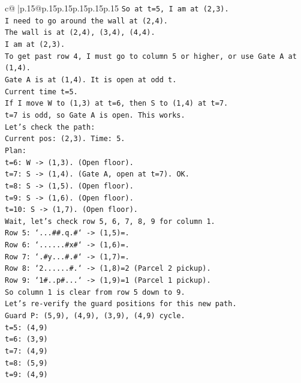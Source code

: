\documentclass{article}
\begin{document}
{\begin{supertabular}{c@{$\;$}|p{.15\linewidth}@{}p{.15\linewidth}p{.15\linewidth}p{.15\linewidth}p{.15\linewidth}p{.15\linewidth}}
{{{\texttt{So at t=5, I am at (2,3).} \\
\texttt{I need to go around the wall at (2,4).} \\
\texttt{The wall is at (2,4), (3,4), (4,4).} \\
\texttt{I am at (2,3).} \\
\texttt{To get past row 4, I must go to column 5 or higher, or use Gate A at (1,4).} \\
\texttt{Gate A is at (1,4). It is open at odd t.} \\
\texttt{Current time t=5.} \\
\texttt{If I move W to (1,3) at t=6, then S to (1,4) at t=7.} \\
\texttt{t=7 is odd, so Gate A is open. This works.} \\
\texttt{Let's check the path:} \\
\texttt{Current pos: (2,3). Time: 5.} \\
\texttt{Plan:} \\
\texttt{t=6: W {-}> (1,3). (Open floor).} \\
\texttt{t=7: S {-}> (1,4). (Gate A, open at t=7). OK.} \\
\texttt{t=8: S {-}> (1,5). (Open floor).} \\
\texttt{t=9: S {-}> (1,6). (Open floor).} \\
\texttt{t=10: S {-}> (1,7). (Open floor).} \\
\texttt{Wait, let's check row 5, 6, 7, 8, 9 for column 1.} \\
\texttt{Row 5: `...\#\#.q.\#` {-}> (1,5)=.} \\
\texttt{Row 6: `......\#x\#` {-}> (1,6)=.} \\
\texttt{Row 7: `.\#y...\#.\#` {-}> (1,7)=.} \\
\texttt{Row 8: `2......\#.` {-}> (1,8)=2 (Parcel 2 pickup).} \\
\texttt{Row 9: `1\#..p\#...` {-}> (1,9)=1 (Parcel 1 pickup).} \\
\texttt{So column 1 is clear from row 5 down to 9.} \\
\texttt{Let's re{-}verify the guard positions for this new path.} \\
\texttt{Guard P: (5,9), (4,9), (3,9), (4,9) cycle.} \\
\texttt{t=5: (4,9)} \\
\texttt{t=6: (3,9)} \\
\texttt{t=7: (4,9)} \\
\texttt{t=8: (5,9)} \\
\texttt{t=9: (4,9)} \\
}}}
\end{supertabular}}
\end{document}
